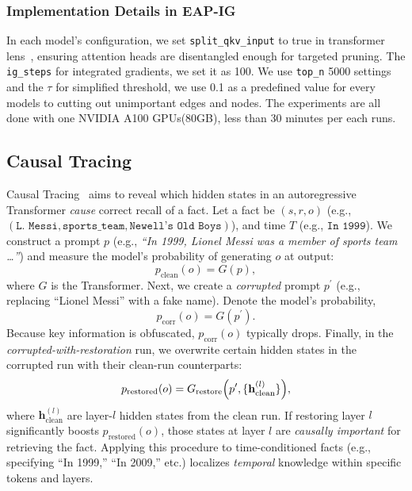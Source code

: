 \subsubsection{Implementation Details in EAP-IG}
\label{sec:detail_in_eapig}
In each model’s configuration, we set \texttt{split\_qkv\_input} to true in transformer lens~\citep{transformerlens}, ensuring attention heads are disentangled enough for targeted pruning.
The \texttt{ig\_steps} for integrated gradients, we set it as 100.
We use \texttt{top\_n} 5000 settings and the $\tau$ for simplified threshold, we use 0.1 as a predefined value for every models to cutting out unimportant edges and nodes.
The experiments are all done with one NVIDIA A100 GPUs(80GB), less than 30 minutes per each runs.

\subsection{Causal Tracing}
\label{sec:causal_tracing_theme}
Causal Tracing~\citep{causal, rome} aims to reveal which hidden states in an autoregressive Transformer \emph{cause} correct recall of a fact. 
Let a fact be $(s,r,o)$ (e.g., $(\texttt{L. Messi}, \texttt{sports\_team}, \texttt{Newell's Old Boys})$), and time $T$ (e.g., $\texttt{In 1999}$). 
We construct a prompt $p$ (e.g., \textit{“In 1999, Lionel Messi was a member of sports team …”}) and measure the model’s probability of generating $o$ at output:
\begin{equation}
p_{\mathrm{clean}}(o) = G(p),
\end{equation}
where $G$ is the Transformer. Next, we create a \emph{corrupted} prompt $p^\prime$ (e.g., replacing “Lionel Messi” with a fake name). Denote the model’s probability,
\begin{equation}
p_{\mathrm{corr}}(o) = G(p^\prime).
\end{equation}
Because key information is obfuscated, $p_{\mathrm{corr}}(o)$ typically drops. 
Finally, in the \emph{corrupted-with-restoration} run, we overwrite certain hidden states in the corrupted run with their clean-run counterparts:
\begin{equation}
p_{\mathrm{restored}}(o) = G_{\mathrm{restore}}\Bigl(p^\prime,\{\mathbf{h}^{(l)}_{\mathrm{clean}}\}\Bigr),
\end{equation}
where $\mathbf{h}^{(l)}_{\mathrm{clean}}$ are layer-$l$ hidden states from the clean run. 
If restoring layer $l$ significantly boosts $p_{\mathrm{restored}}(o)$, those states at layer $l$ are \emph{causally important} for retrieving the fact. 
Applying this procedure to time-conditioned facts (e.g., specifying “In 1999,” “In 2009,” etc.) localizes \emph{temporal} knowledge within specific tokens and layers.


